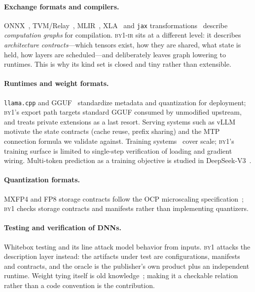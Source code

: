 \documentclass[11pt,a4paper]{article}
\newcommand{\code}[1]{\texttt{#1}}
\newcommand{\byone}{\textsc{by1}}
\newcommand{\ir}{\textsc{by1-ir}}
\begin{document}
\paragraph{Exchange formats and compilers.} ONNX~\cite{onnx2019},
TVM/Relay~\cite{chen2018tvm}, MLIR~\cite{lattner2021mlir},
XLA~\cite{abadi2016tensorflow} and \code{jax} transformations~\cite{jax2018}
describe \emph{computation graphs} for compilation. \ir{} sits at a
different level: it describes \emph{architecture contracts}---which tensors
exist, how they are shared, what state is held, how layers are
scheduled---and deliberately leaves graph lowering to runtimes. This is why
its kind set is closed and tiny rather than extensible.

\paragraph{Runtimes and weight formats.} \code{llama.cpp} and
GGUF~\cite{llamacpp2023} standardize metadata and quantization for
deployment; \byone{}'s export path targets standard GGUF consumed by
unmodified upstream, and treats private extensions as a last resort. Serving
systems such as vLLM~\cite{kwon2023vllm} motivate the state contracts
(cache reuse, prefix sharing) and the MTP connection formula we validate
against. Training systems~\cite{shoeybi2019megatron} cover scale; \byone{}'s
training surface is limited to single-step verification of loading and
gradient wiring. Multi-token prediction as a training objective is studied in
DeepSeek-V3~\cite{deepseekai2024deepseekv3}.

\paragraph{Quantization formats.} MXFP4 and FP8 storage contracts follow the
OCP microscaling specification~\cite{ocp2023mx}; \byone{} checks storage
contracts and manifests rather than implementing quantizers.

\paragraph{Testing and verification of DNNs.} Whitebox testing
\cite{pei2017deepxplore} and its line attack model behavior from inputs.
\byone{} attacks the description layer instead: the artifacts under test are
configurations, manifests and contracts, and the oracle is the publisher's
own product plus an independent runtime. Weight tying itself is old
knowledge~\cite{presswolf2017using}; making it a checkable relation rather
than a code convention is the contribution.
\end{document}

